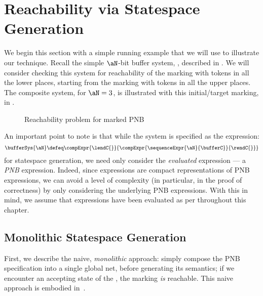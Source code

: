 \section{Reachability via Statespace Generation}\label{sec:compStatespaceGen}

We begin this section with a simple running example that we will use to
illustrate our technique. Recall the simple $\aN$-bit buffer system,
\bufferSys{\aN}, described in . We will consider
checking this system for reachability of the marking with tokens in all the
lower places, starting from the marking with tokens in all the upper places.
The composite system, for $\aN=3$, is illustrated with this initial/target
marking, in .

\begin{figure}[ht]
\centering
{}
\caption{Reachability problem for marked PNB }
\label{fig:markedbuffer3}
\end{figure}

\begin{remark}\label{rem:evalExpr}
    An important point to note is that while the \bufferSys{\aN} system is
    specified as the \DSL{} expression:
    \[
        \bufferSys{\aN} \defeq \compExpr{\lendC{}}{\compExpr{\sequenceExpr{\aN}{\bufferC}}{\rendC{}}}
    \] for statespace generation, we need only consider the \emph{evaluated}
    expression --- a \emph{PNB} expression. Indeed, since \DSL{} expressions
    are compact representations of PNB expressions, we can avoid a level of
    complexity (in particular, in the proof of correctness) by only considering
    the underlying PNB expressions.  With this in mind, we assume that \DSL{}
    expressions have been evaluated as per 
    throughout this chapter.
\end{remark}

\subsection{Monolithic Statespace Generation}

First, we describe the naive, \emph{monolithic} approach: simply compose the
PNB specification into a single global net, before generating its \TNFA{}
semantics; if we encounter an accepting state of the \TNFA, the marking
\emph{is} reachable. This naive approach is embodied
in~.

